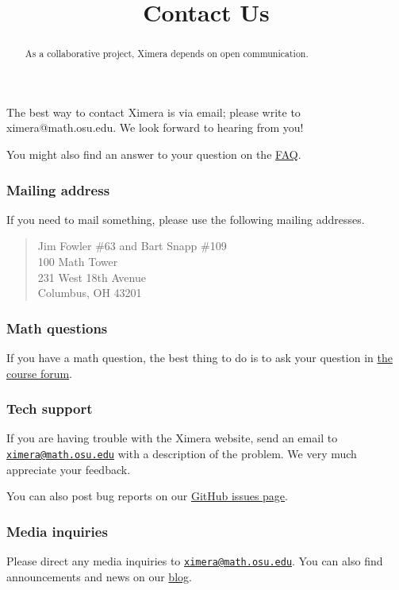 \documentclass{ximera}
\title{Contact Us}
\begin{document}
\begin{abstract}
  As a collaborative project, Ximera depends on open communication.
\end{abstract}
\maketitle

The best way to contact Ximera is via email; please write to
ximera@math.osu.edu. We
look forward to hearing from you!

You might also find an answer to your question on the
\href{/about/faq}{FAQ}.

\subsubsection{Mailing address}

If you need to mail something, please use the following mailing
addresses.
\begin{quote}
  Jim Fowler \#63 and Bart Snapp \#109 \\
  100 Math Tower \\
  231 West 18th Avenue \\
  Columbus, OH 43201
\end{quote}

\subsubsection{Math questions}\label{math-questions}

If you have a math question, the best thing to do is to ask your
question in \href{/courses}{the course forum}.

\subsubsection{Tech support}\label{tech-support}

If you are having trouble with the Ximera website, send an email to
\href{mailto:ximera@math.osu.edu}{\nolinkurl{ximera@math.osu.edu}} with
a description of the problem. We very much appreciate your feedback.

You can also post bug reports on our
\href{https://github.com/kisonecat/ximera/issues}{GitHub issues page}.

\subsubsection{Media inquiries}\label{media-inquiries}

Please direct any media inquiries to
\href{mailto:ximera@math.osu.edu}{\nolinkurl{ximera@math.osu.edu}}. You
can also find announcements and news on our \href{/blog}{blog}.
\end{document}
